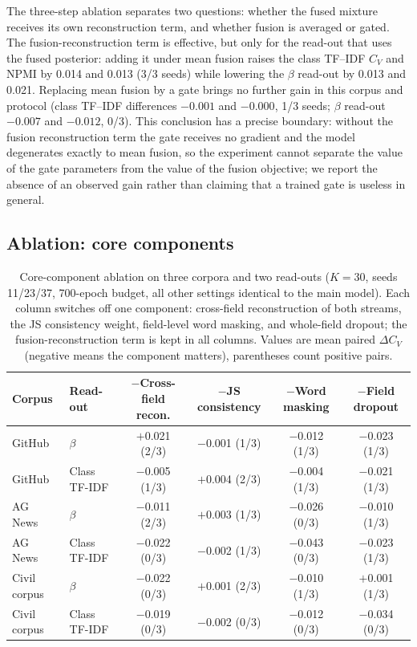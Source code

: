 \documentclass[11pt]{article}
\begin{document}
The three-step ablation separates two questions: whether the fused mixture receives its own
reconstruction term, and whether fusion is averaged or gated. The fusion-reconstruction term is
effective, but only for the read-out that uses the fused posterior: adding it under mean fusion
raises the class TF--IDF $C_V$ and NPMI by 0.014 and 0.013 (3/3 seeds) while lowering the $\beta$
read-out by 0.013 and 0.021. Replacing mean fusion by a gate brings no further gain in this corpus
and protocol (class TF--IDF differences $-0.001$ and $-0.000$, 1/3 seeds; $\beta$ read-out
$-0.007$ and $-0.012$, 0/3). This conclusion has a precise boundary: without the fusion
reconstruction term the gate receives no gradient and the model degenerates exactly to mean fusion,
so the experiment cannot separate the value of the gate parameters from the value of the fusion
objective; we report the absence of an observed gain rather than claiming that a trained gate is
useless in general.

\subsection{Ablation: core components}

\begin{table}[t]
\centering
\caption{Core-component ablation on three corpora and two read-outs ($K=30$, seeds 11/23/37, 700-epoch budget, all other settings identical to the main model). Each column switches off one component: cross-field reconstruction of both streams, the JS consistency weight, field-level word masking, and whole-field dropout; the fusion-reconstruction term is kept in all columns. Values are mean paired $\Delta C_V$ (negative means the component matters), parentheses count positive pairs.}
\label{tab:core-ablation}
\small
\setlength{\tabcolsep}{5pt}
\begin{tabular}{llcccc}
\toprule
Corpus & Read-out & $-$Cross-field recon. & $-$JS consistency & $-$Word masking & $-$Field dropout \\
\midrule
GitHub & $\beta$ & $+$0.021 (2/3) & $-$0.001 (1/3) & $-$0.012 (1/3) & $-$0.023 (1/3) \\
GitHub & Class TF-IDF & $-$0.005 (1/3) & $+$0.004 (2/3) & $-$0.004 (1/3) & $-$0.021 (1/3) \\
\midrule
AG News & $\beta$ & $-$0.011 (2/3) & $+$0.003 (1/3) & $-$0.026 (0/3) & $-$0.010 (1/3) \\
AG News & Class TF-IDF & $-$0.022 (0/3) & $-$0.002 (1/3) & $-$0.043 (0/3) & $-$0.023 (1/3) \\
\midrule
Civil corpus & $\beta$ & $-$0.022 (0/3) & $+$0.001 (2/3) & $-$0.010 (1/3) & $+$0.001 (1/3) \\
Civil corpus & Class TF-IDF & $-$0.019 (0/3) & $-$0.002 (0/3) & $-$0.012 (0/3) & $-$0.034 (0/3) \\
\bottomrule
\end{tabular}
\end{table}
\end{document}
